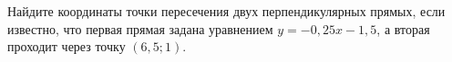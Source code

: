 \begin{ex}
	\begin{condition}
		Найдите координаты точки пересечения двух перпендикулярных прямых, если известно, что первая прямая задана уравнением $y=-0,25x-1,5$, а вторая проходит через точку $(6,5;1)$.
	\end{condition}
\end{ex}